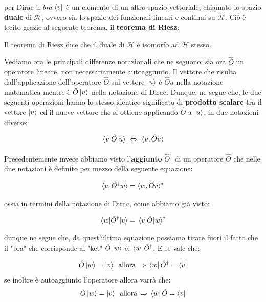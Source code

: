 	per Dirac il \textit{bra} $\bra{v}$ è un elemento di un altro spazio vettoriale, chiamato lo spazio \textbf{duale} di $\mathcal{H}$, ovvero sia lo spazio dei funzionali lineari e continui su $\mathcal{H}$. Ciò è lecito grazie al seguente teorema, il \textbf{teorema di Riesz}:

\begin{myth}
	Il teorema di Riesz dice che il duale di $\mathcal{H}$ è isomorfo ad $\mathcal{H}$ stesso.
\end{myth}

	Vediamo ora le principali differenze notazionali che ne seguono: sia ora $\hat{O}$ un operatore lineare, non necessariamente autoaggiunto. Il vettore che risulta dall'applicazione dell'operatore $\hat{O}$ sul vettore $\ket{u}$ è $\hat{O}u$ nella notazione matematica mentre è $\hat{O}\ket{u}$ nella notazione di Dirac. Dunque, ne segue che, le due seguenti operazioni hanno lo stesso identico significato di \textbf{prodotto scalare} tra il vettore $\ket{v}$ ed il nuove vettore che si ottiene applicando $\hat{O}$ a $\ket{u}$, in due notazioni diverse:
	
\begin{align*}
	\mel{v}{\hat{O}}{u} \,\, \Leftrightarrow \,\, \langle v, \hat{O}u \rangle
\end{align*}

	Precedentemente invece abbiamo visto l'\textbf{aggiunto} $\hat{O}^{\dagger}$ di un operatore $\hat{O}$ che nelle due notazioni è definito per mezzo della seguente equazione:
	
\begin{align*}
	\langle v, \hat{O}^{\dagger}w \rangle = \langle w, \hat{O}v \rangle^*
\end{align*}

	ossia in termini della notazione di Dirac, come abbiamo già visto:
	
\begin{align*}
	\mel{w}{\hat{O}^{\dagger}}{v} = \mel{v}{\hat{O}}{w}^*
\end{align*}

	dunque ne segue che, da quest'ultima equazione possiamo tirare fuori il fatto che il "bra" che corrisponde al "ket" $\hat{O}\ket{w}$ è: $\bra{w}\hat{O}^{\dagger}$. E se vale che:

\begin{nb}
\begin{align*}
	\hat{O}\ket{w} = \ket{v} \,\,\, \text{allora} \, \Rightarrow \, \bra{w}\hat{O}^{\dagger}= \bra{v}
\end{align*}
	se inoltre è autoaggiunto l'operatore allora varrà che:
\begin{align*}
	\hat{O}\ket{w} = \ket{v} \,\,\, \text{allora} \, \Rightarrow \, \bra{w}\hat{O}= \bra{v}
\end{align*}
\end{nb}

